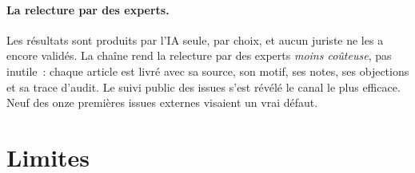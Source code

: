 \documentclass[11pt,a4paper]{article}
\begin{document}
\paragraph{La relecture par des experts.}
Les résultats sont produits par l'IA seule, par choix, et aucun juriste ne les a encore validés. La chaîne rend la relecture par des experts \emph{moins coûteuse}, pas inutile~: chaque article est livré avec sa source, son motif, ses notes, ses objections et sa trace d'audit. Le suivi public des issues s'est révélé le canal le plus efficace. Neuf des onze premières issues externes visaient un vrai défaut.

\section{Limites}
\end{document}

